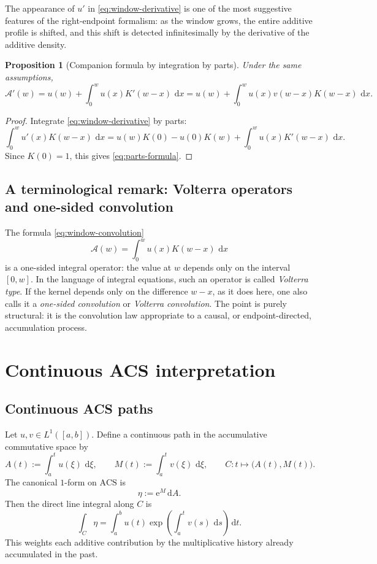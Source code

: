 \documentclass[11pt]{article}
\newtheorem{proposition}{Proposition}
\newcommand{\ACS}{\mathrm{ACS}}
\newcommand{\dd}{\,\mathrm{d}}
\newcommand{\ee}{\mathrm{e}}
\begin{document}
The appearance of $u'$ in \eqref{eq:window-derivative} is one of the most suggestive features of the right-endpoint formalism: as the window grows, the entire additive profile is shifted, and this shift is detected infinitesimally by the derivative of the additive density.

\begin{proposition}[Companion formula by integration by parts]
\label{prop:parts-formula}
Under the same assumptions,
\begin{equation}
\label{eq:parts-formula}
\mathcal{A}'(w)
=
 u(w)+\int_0^w u(x)K'(w-x)\,\dd x
=
 u(w)+\int_0^w u(x)v(w-x)K(w-x)\,\dd x.
\end{equation}
\end{proposition}

\begin{proof}
Integrate \eqref{eq:window-derivative} by parts:
\[
\int_0^w u'(x)K(w-x)\,\dd x
=
 u(w)K(0)-u(0)K(w)+\int_0^w u(x)K'(w-x)\,\dd x.
\]
Since $K(0)=1$, this gives \eqref{eq:parts-formula}.
\end{proof}

\subsection{A terminological remark: Volterra operators and one-sided convolution}

The formula \eqref{eq:window-convolution}
\[
\mathcal{A}(w)=\int_0^w u(x)K(w-x)\,\dd x
\]
is a one-sided integral operator: the value at $w$ depends only on the interval $[0,w]$. In the language of integral equations, such an operator is called \emph{Volterra type}. If the kernel depends only on the difference $w-x$, as it does here, one also calls it a \emph{one-sided convolution} or \emph{Volterra convolution}. The point is purely structural: it is the convolution law appropriate to a causal, or endpoint-directed, accumulation process.

\section{Continuous ACS interpretation}

\subsection{Continuous ACS paths}

Let $u,v\in L^1([a,b])$. Define a continuous path in the accumulative commutative space by
\begin{equation}
\label{eq:acs-path}
A(t):=\int_a^t u(\xi)\,\dd\xi,
\qquad
M(t):=\int_a^t v(\xi)\,\dd\xi,
\qquad
C:t\mapsto \bigl(A(t),M(t)\bigr).
\end{equation}
The canonical $1$-form on $\ACS$ is
\begin{equation}
\label{eq:eta}
\eta:=\ee^M\dd A.
\end{equation}
Then the direct line integral along $C$ is
\begin{equation}
\label{eq:direct-line-integral}
\int_C \eta
=
\int_a^b u(t)\exp\!\left(\int_a^t v(s)\,\dd s\right)\dd t.
\end{equation}
This weights each additive contribution by the multiplicative history already accumulated in the past.
\end{document}
